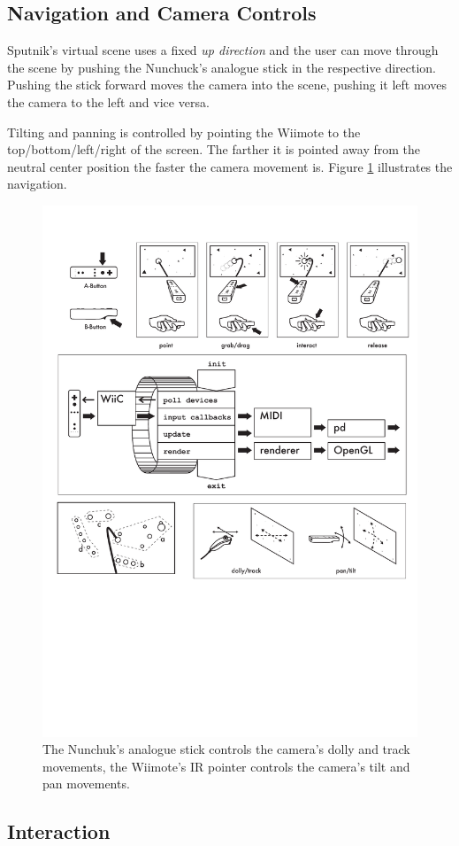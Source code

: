 \documentclass[10pt,a4paper]{scrartcl}
\begin{document}
\subsection{Navigation and Camera Controls}
Sputnik's virtual scene uses a fixed \emph{up direction} and the user can move through the scene by pushing the Nunchuck's analogue stick in the respective direction. Pushing the stick forward moves the camera into the scene, pushing it left moves the camera to the left and vice versa.

Tilting and panning is controlled by pointing the Wiimote to the top/bottom/left/right of the screen. The farther it is pointed away from the neutral center position the faster the camera movement is. Figure \ref{fig:sputnik-navigation} illustrates the navigation.

\begin{figure}[hbtp]
\begin{center}
\includegraphics[width=0.7\columnwidth]{img/navigation}
\caption{The Nunchuk's analogue stick controls the camera's dolly and track movements, the Wiimote's IR pointer controls the camera's tilt and pan movements.}
\label{fig:sputnik-navigation}
\end{center}
\end{figure}




\subsection{Interaction}
\end{document}
